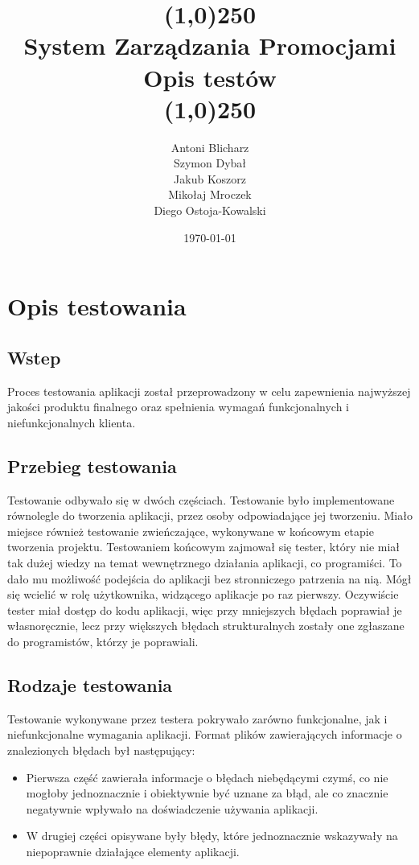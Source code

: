 \documentclass[a4paper,12pt]{article}
\title{
    \line(1,0){250}\\
    System Zarządzania Promocjami\\
    Opis testów\\
    \line(1,0){250}}
\author{Antoni Blicharz\\
        Szymon Dybał\\
        Jakub Koszorz\\
        Mikołaj Mroczek\\
        Diego Ostoja-Kowalski\\}
\date{\today}
\begin{document}
\begin{titlepage}
    \maketitle
\end{titlepage}

\newpage

\section{Opis testowania}

\subsection{Wstep}

Proces testowania aplikacji został przeprowadzony w celu zapewnienia najwyższej jakości produktu finalnego oraz spełnienia wymagań funkcjonalnych i niefunkcjonalnych klienta.

\subsection{Przebieg testowania}

Testowanie odbywało się w dwóch częściach.
Testowanie było implementowane równolegle do tworzenia aplikacji, przez osoby odpowiadające jej tworzeniu.
Miało miejsce również testowanie zwieńczające, wykonywane w końcowym etapie tworzenia projektu.
Testowaniem końcowym zajmował się tester, który nie miał tak dużej wiedzy na temat wewnętrznego działania aplikacji, co programiści.
To dało mu możliwość podejścia do aplikacji bez stronniczego patrzenia na nią.
Mógł się wcielić w rolę użytkownika, widzącego aplikacje po raz pierwszy.
Oczywiście tester miał dostęp do kodu aplikacji, więc przy mniejszych błędach poprawiał je własnoręcznie, lecz przy większych błędach strukturalnych zostały one zgłaszane do programistów, którzy je poprawiali.

\subsection{Rodzaje testowania}

Testowanie wykonywane przez testera pokrywało zarówno funkcjonalne, jak i niefunkcjonalne wymagania aplikacji.
Format plików zawierających informacje o znalezionych błędach był następujący:
\begin{itemize}
    \item Pierwsza część zawierała informacje o błędach niebędącymi czymś, co nie mogłoby jednoznacznie i obiektywnie być uznane za błąd, ale co znacznie negatywnie wpływało na doświadczenie używania aplikacji.
    \item W drugiej części opisywane były błędy, które jednoznacznie wskazywały na niepoprawnie działające elementy aplikacji.
\end{itemize}
\end{document}
